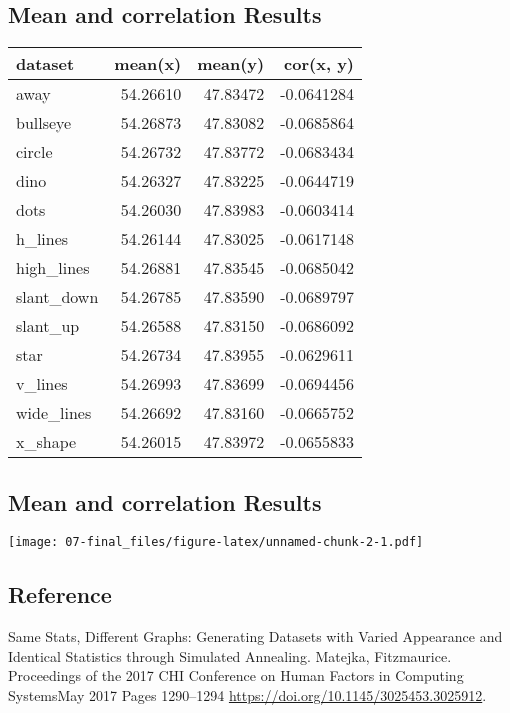 \documentclass[
]{book}
\begin{document}
\hypertarget{mean-and-correlation-results}{%
\subsection{Mean and correlation Results}\label{mean-and-correlation-results}}

\begin{tabular}{l|r|r|r}
\hline
dataset & mean(x) & mean(y) & cor(x, y)\\
\hline
away & 54.26610 & 47.83472 & -0.0641284\\
\hline
bullseye & 54.26873 & 47.83082 & -0.0685864\\
\hline
circle & 54.26732 & 47.83772 & -0.0683434\\
\hline
dino & 54.26327 & 47.83225 & -0.0644719\\
\hline
dots & 54.26030 & 47.83983 & -0.0603414\\
\hline
h\_lines & 54.26144 & 47.83025 & -0.0617148\\
\hline
high\_lines & 54.26881 & 47.83545 & -0.0685042\\
\hline
slant\_down & 54.26785 & 47.83590 & -0.0689797\\
\hline
slant\_up & 54.26588 & 47.83150 & -0.0686092\\
\hline
star & 54.26734 & 47.83955 & -0.0629611\\
\hline
v\_lines & 54.26993 & 47.83699 & -0.0694456\\
\hline
wide\_lines & 54.26692 & 47.83160 & -0.0665752\\
\hline
x\_shape & 54.26015 & 47.83972 & -0.0655833\\
\hline
\end{tabular}

\hypertarget{mean-and-correlation-results-1}{%
\subsection{Mean and correlation Results}\label{mean-and-correlation-results-1}}

\texttt{[image: 07-final\_files/figure-latex/unnamed-chunk-2-1.pdf]}

\hypertarget{reference}{%
\subsection{Reference}\label{reference}}

Same Stats, Different Graphs: Generating Datasets with Varied Appearance and Identical Statistics through Simulated Annealing. Matejka, Fitzmaurice. Proceedings of the 2017 CHI Conference on Human Factors in Computing SystemsMay 2017 Pages 1290--1294 \url{https://doi.org/10.1145/3025453.3025912}.
\end{document}
